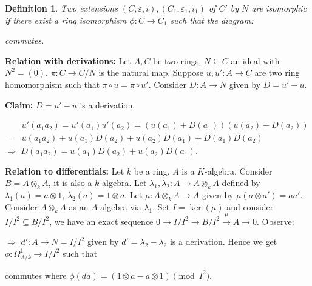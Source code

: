 \documentclass[cs4size]{article}
\newcommand{\su}{\subseteq}
\newcommand{\ra}{\rightarrow}
\newcommand{\xr}{\xrightarrow}
\newcommand{\Ra}{\Rightarrow}
\newtheorem{definition}{Definition}
\begin{document}
\begin{definition}
Two extensions $(C,\varepsilon,i),(C_1,\varepsilon_1,i_1)$ of $C'$ by $N$ are isomorphic if there exist a ring isomorphism $\phi: C\ra C_1$ such that the diagram:

\begin{center}
\end{center}
commutes.
\end{definition}

\textbf{Relation with derivations: } Let $A,C$ be two rings, $N\su C$ an ideal with $N^2=(0)$. $\pi: C\ra C/N$ is the natural map. Suppose $u,u': A\ra C$ are two ring homomorphism such that $\pi\circ u=\pi\circ u'$. Consider $D: A\ra N$ given by $D=u'-u$.

\textbf{Claim: }$D=u'-u$ is a derivation.

\begin{align*}
&u'(a_1a_2)=u'(a_1)u'(a_2)=(u(a_1)+D(a_1))(u(a_2)+D(a_2))\\
=&u(a_1a_2)+u(a_1)D(a_2)+u(a_2)D(a_1)+D(a_1)D(a_2)
\end{align*}
$\Ra$ $D(a_1a_2)=u(a_1)D(a_2)+u(a_2)D(a_1)$.

\textbf{Relation to differentials: }Let $k$ be a ring. $A$ is a $K$-algebra. Consider $B=A\otimes_kA$, it is also a $k$-algebra. Let $\lambda_1,\lambda_2: A\ra A\otimes_kA$ defined by $\lambda_1(a)=a\otimes1$, $\lambda_2(a)=1\otimes a$. Let $\mu: A\otimes_kA\ra A$ given by $\mu(a\otimes a')=aa'$. Consider $A\otimes_kA$ as an $A$-algebra via $\lambda_1$. Set $I=\ker(\mu)$ and consider $I/I^2\su B/I^2$, we have an exact sequence $0\ra I/I^2\ra B/I^2\xr{\mu}A\ra0$. Observe:
$\Ra$ $d': A\ra N=I/I^2$ given by $d'=\overline{\lambda_2}-\overline{\lambda_2}$ is a derivation. Hence we get $\phi: \Omega_{A/k}^1\ra I/I^2$ such that

\begin{center}
\end{center}
commutes where $\phi(da)=(1\otimes a-a\otimes 1)\pmod{I^2}$.
\end{document}
